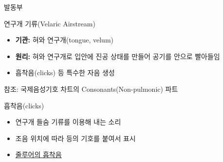 \documentclass[11pt, aspectratio=169]{beamer}
\newcommand{\textds}[1]{{\ipafont #1}}
\begin{document}
\begin{frame}[t]{발동부}
    \begin{block}{연구개 기류(Velaric Airstream)}
        \begin{itemize}
            \item \textbf{기관:} 혀와 연구개(tongue, velum)
            \item \textbf{원리:} 혀와 연구개로 입안에 진공 상태를 만들어 공기를 안으로 빨아들임
            \item 흡착음(clicks) 등 특수한 자음 생성
        \end{itemize}
    \end{block}
    참조: 국제음성기호 차트의 Consonants(Non-pulmonic) 파트
    \begin{block}{흡착음(clicks)}
        \begin{itemize}
            \item 연구개 들숨 기류를 이용해 내는 소리
            \item 조음 위치에 따라 \textds{[ʘ] [ǀ] [ǁ] [ǂ] [ǃ]} 등의 기호를 붙여서 표시
            \item {} \href{https://www.phonetics.ucla.edu/course/chapter6/zulu/zulu.html}{\underline{줄루어의 흡착음}}
        \end{itemize}
    \end{block}
\end{frame}
\end{document}
